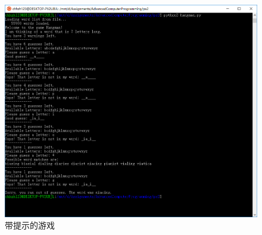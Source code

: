\documentclass[logo,reportComp]{thesis}
\begin{document}
\begin{figure}[H]
\centering
\includegraphics[width=\linewidth]{fig/hint.PNG}
\caption{带提示的游戏}
\end{figure}
\end{document}
